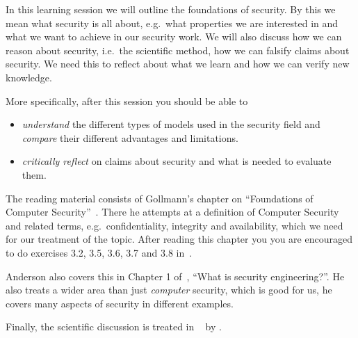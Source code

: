 In this learning session we will outline the foundations of security.
By this we mean what security is all about, e.g.\ what properties we are 
interested in and what we want to achieve in our security work.
We will also discuss how we can reason about security, i.e.\ the scientific 
method, how we can falsify claims about security.
We need this to reflect about what we learn and how we can verify new 
knowledge.

More specifically, after this session you should be able to
\begin{itemize}
  \item \emph{understand} the different types of models used in the security 
    field and \emph{compare} their different advantages and limitations.
  \item \emph{critically reflect} on claims about security and what is needed 
    to evaluate them.
\end{itemize}

The reading material consists of Gollmann's chapter on \enquote{Foundations of 
  Computer Security}~\cite[Chap.\ 3]{Gollmann2011cs}.
There he attempts at a definition of Computer Security and related terms, e.g.\ 
confidentiality, integrity and availability, which we need for our treatment of 
the topic.
After reading this chapter you you are encouraged to do exercises 3.2, 3.5, 
3.6, 3.7 and 3.8 in~\cite{Gollmann2011cs}.

Anderson also covers this in Chapter 1 of~\cite{Anderson2008sea}, \enquote{What 
  is security engineering?}.
He also treats a wider area than just \emph{computer} security, which is good 
for us, he covers many aspects of security in different examples.

Finally, the scientific discussion is treated in 
~\cite{ComputerSecurityExperiments} by 
\citeauthor{ComputerSecurityExperiments}.
